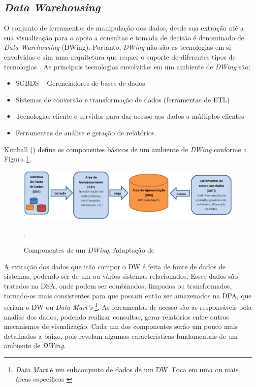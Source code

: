 \subsection{\emph{Data Warehousing}}

O conjunto de ferramentas de manipulação dos dados, desde sua extração até a sua visualização para o apoio a consultas e tomada de decisão é denominado de \emph{Data Warehousing} (DWing). Portanto,  \emph{DWing} não são as tecnologias em si envolvidas e sim uma arquitetura que requer o suporte de diferentes tipos de tecnologias \cite{inmon2002}.  As principais tecnologias envolvidas em um ambiente de \emph{DWing} são:


\begin{itemize}
\item SGBDS – Gerenciadores de bases de dados
\item Sistemas de conversão e transformação de dados (ferramentas de ETL)
\item Tecnologias cliente e servidor para dar acesso aos dados a múltiplos clientes
\item Ferramentas de análise e geração de relatórios.
\end{itemize}

Kimball (\citeyear{kimball2002}) define os componentes básicos de um ambiente de \emph{DWing} conforme a Figura \ref{componentesdw}.

 \begin{figure}[!htb]
 	\centering
 		\includegraphics[scale=0.5]{figuras/componentesDW}
 		\caption{Componentes de um \emph{DWing}. Adaptação de \cite{kimball2002}}.
 		\label{componentesdw}
 \end{figure}


 A extração dos dados que irão compor o DW é feita de fonte de dados de sistemas, podendo ser de um ou vários sistemas relacionados. Esses dados são tratados na DSA, onde podem ser combinados, limpados ou transformados, tornado-os mais consistentes para que possam então ser amazenados na DPA, que seriam o DW ou \emph{Data Mart's}
 \footnote{\emph{Data Mart} é um subconjunto de dados de um DW. Foca em uma ou mais áreas específicas \cite{kimball2002}}. 
 As ferramentas de acesso são as responsáveis pela análise dos dados, podendo realizar consultas, gerar relatórios entre outros mecanismos de visualização. Cada um dos componentes serão um pouco mais detalhados a baixo, pois revelam algumas características fundamentais de um ambiente de \emph{DWing}.

